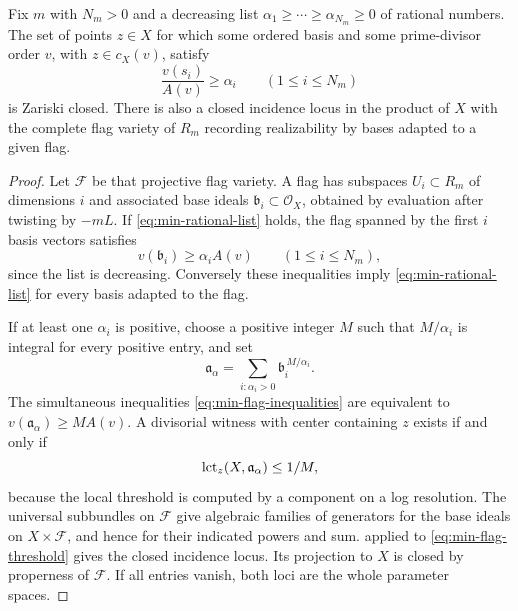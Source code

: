 \begin{lemma}
\label{lem:min-flags}
Fix $m$ with $N_m>0$ and a decreasing list $\alpha_1\geq\cdots\geq\alpha_{N_m}\geq0$ of rational numbers. The set of points $z\in X$ for which some ordered basis and some prime-divisor order $v$, with $z\in c_X(v)$, satisfy
\begin{equation}
\label{eq:min-rational-list}
 \frac{v(s_i)}{{A}(v)}\geq\alpha_i
       \qquad(1\leq i\leq N_m)
\end{equation}
is Zariski closed. There is also a closed incidence locus in the product of $X$ with the complete flag variety of $R_m$ recording realizability by bases adapted to a given flag.
\end{lemma}

\begin{proof}
Let $\mathcal{F}$ be that projective flag variety. A flag has subspaces $U_i\subset R_m$ of dimensions $i$ and associated base ideals $\mathfrak{b}_i\subset\mathcal{O}_X$, obtained by evaluation after twisting by $-mL$. If \eqref{eq:min-rational-list} holds, the flag spanned by the first $i$ basis vectors satisfies
\begin{equation}
\label{eq:min-flag-inequalities}
 v(\mathfrak{b}_i)\geq\alpha_i{A}(v)
       \qquad(1\leq i\leq N_m),
\end{equation}
since the list is decreasing. Conversely these inequalities imply \eqref{eq:min-rational-list} for every basis adapted to the flag.

If at least one $\alpha_i$ is positive, choose a positive integer $M$ such that $M/\alpha_i$ is integral for every positive entry, and set
\[
 \mathfrak{a}_\alpha
    =\sum_{i:\alpha_i>0}\mathfrak{b}_i^{\,M/\alpha_i}.
\]
The simultaneous inequalities \eqref{eq:min-flag-inequalities} are equivalent to $v(\mathfrak{a}_\alpha)\geq M{A}(v)$. A divisorial witness with center containing $z$ exists if and only if
\begin{equation}
\label{eq:min-flag-threshold}
 \operatorname{lct}_z(X,\mathfrak{a}_\alpha)\leq1/M,
\end{equation}
because the local threshold is computed by a component on a log resolution. The universal subbundles on $\mathcal{F}$ give algebraic families of generators for the base ideals on $X\times\mathcal{F}$, and hence for their indicated powers and sum.  applied to \eqref{eq:min-flag-threshold} gives the closed incidence locus. Its projection to $X$ is closed by properness of $\mathcal{F}$. If all entries vanish, both loci are the whole parameter spaces.
\end{proof}


